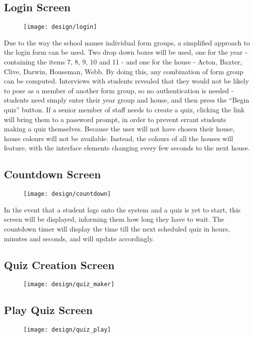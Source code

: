 \subsection{Login Screen}
\begin{figure}[h!]
  \texttt{[image: design/login]}
\end{figure}

Due to the way the school names individual form groups, a simplified approach to the login form can be used. Two drop down boxes will be used, one for the year - containing the items 7, 8, 9, 10 and 11 - and one for the house - Acton, Baxter, Clive, Darwin, Houseman, Webb. By doing this, any combination of form group can be computed. Interviews with students revealed that they would not be likely to pose as a member of another form group, so no authentication is needed - students need simply enter their year group and house, and then press the ``Begin quiz'' button. If a senior member of staff needs to create a quiz, clicking the link will bring them to a password prompt, in order to prevent errant students making a quiz themselves. Because the user will not have chosen their house, house colours will not be available. Instead, the colours of all the houses will feature, with the interface elements changing every few seconds to the next house.

\clearpage

\subsection{Countdown Screen}
\begin{figure}[h!]
  \texttt{[image: design/countdown]}
\end{figure}

In the event that a student logs onto the system and a quiz is yet to start, this screen will be displayed, informing them how long they have to wait. The countdown timer will display the time till the next scheduled quiz in hours, minutes and seconds, and will update accordingly.

\clearpage

\subsection{Quiz Creation Screen}
\begin{figure}[h!]
  \texttt{[image: design/quiz\_maker]}
\end{figure}

\clearpage

\subsection{Play Quiz Screen}
\begin{figure}[h!]
  \texttt{[image: design/quiz\_play]}
\end{figure}
